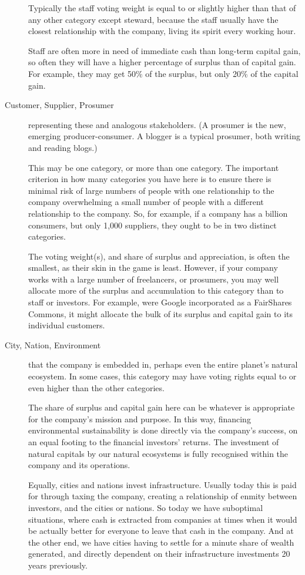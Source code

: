 \begin{description}
Typically the staff voting weight is equal to or slightly higher than that of any other category except steward, because the staff usually have the closest relationship with the company, living its spirit every working hour.


Staff are often more in need of immediate cash than long-term capital gain, so often they will have a higher percentage of surplus than of capital gain. For example, they may get 50\% of the surplus, but only 20\% of the capital gain.


\item[Customer, Supplier, Prosumer] representing these and analogous stakeholders. (A prosumer is the new, emerging producer-consumer. A blogger is a typical prosumer, both writing and reading blogs.) 


This may be one category, or more than one category. The important criterion in how many categories you have here is to ensure there is minimal risk of large numbers of people with one relationship to the company overwhelming a small number of people with a different relationship to the company. So, for example, if a company has a billion consumers, but only 1,000 suppliers, they ought to be in two distinct categories.


The voting weight(s), and share of surplus and appreciation, is often the smallest, as their skin in the game is least. However, if your company works with a large number of freelancers, or prosumers, you may well allocate more of the surplus and accumulation to this category than to staff or investors. For example, were Google  incorporated as a FairShares Commons,  it might allocate the bulk of its surplus and capital gain to its individual customers.


\item[City, Nation, Environment] that the company is embedded in, perhaps even the entire planet’s natural ecosystem. In some cases, this category may have voting rights equal to or even higher than the other categories.


The share of surplus and capital gain here can be whatever is appropriate for the company’s mission and purpose. In this way, financing environmental sustainability is done directly via the company's success, on an equal footing to the financial investors' returns. The investment of natural capitals by our natural ecosystems is fully recognised within the company and its operations.


Equally, cities and nations invest infrastructure. Usually today this is paid for through taxing the company, creating a relationship of enmity between investors, and the cities or nations. So today we have suboptimal situations, where cash is extracted from companies at times when it would be actually better for everyone to leave that cash in the company. And at the other end, we have cities having to settle for a minute share of wealth generated, and directly dependent on their infrastructure investments 20 years previously. 



\end{description}
